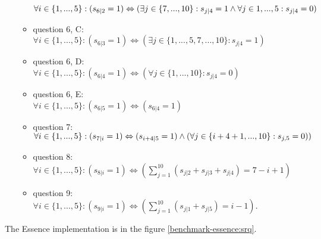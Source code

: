 \begin{itemize}
\begin{itemize}
      $\forall i \in \{1,...,5\}: (s_{6|2} = 1) \Leftrightarrow (\exists j \in \{7,...,10\}: s_{j|4} = 1 \wedge\\ \forall j \in {1,...,5}: s_{j|4} = 0)$
    \item question 6, C: \\
      $\forall i \in \{1,...,5\}: (s_{6|3} = 1) \Leftrightarrow (\exists j \in \{1,...,5,7,...,10\}: s_{j|4} = 1)$
    \item question 6, D: \\
      $\forall i \in \{1,...,5\}: (s_{6|4} = 1) \Leftrightarrow (\forall j \in \{1,...,10\}: s_{j|4} = 0)$
    \item question 6, E: \\
      $\forall i \in \{1,...,5\}: (s_{6|5} = 1) \Leftrightarrow (s_{6|4} = 1)$
    \item question 7: \\
      $\forall i \in \{1,...,5\}: (s_{7|i} = 1) \Leftrightarrow (s_{i+4|5} = 1) \wedge ( \forall j \in \{i+4+1,...,10\}: s_{j,5} = 0 ) )$
    \item question 8: \\
      $\forall i \in \{1,...,5\}: (s_{8|i} = 1) \Leftrightarrow \left(\sum_{j=1}^{10}{\left(s_{j|2} + s_{j|3} + s_{j|4}\right)} = 7-i+1 \right)$
    \item question 9: \\
      $\forall i \in \{1,...,5\}: (s_{9|i} = 1) \Leftrightarrow \left(\sum_{j=1}^{10}{\left(s_{j|1} + s_{j|5}\right)} = i-1 \right)$. 
   \end{itemize}
	\end{itemize}
The Essence implementation is in the figure \ref{benchmark-essence:srq}.

